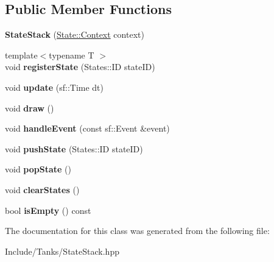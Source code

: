 \subsection*{Public Member Functions}
\begin{DoxyCompactItemize}
\item 
\hypertarget{class_state_stack_a365f29afd04a9370f6638cbe3b4ff92a}{}{\bfseries State\+Stack} (\hyperlink{struct_state_1_1_context}{State\+::\+Context} context)\label{class_state_stack_a365f29afd04a9370f6638cbe3b4ff92a}

\item 
\hypertarget{class_state_stack_a9d64daa479c2cccad6f2ede77741a352}{}{\footnotesize template$<$typename T $>$ }\\void {\bfseries register\+State} (States\+::\+I\+D state\+I\+D)\label{class_state_stack_a9d64daa479c2cccad6f2ede77741a352}

\item 
\hypertarget{class_state_stack_ae90af9f56ce7774d47d0407e2680c27d}{}void {\bfseries update} (sf\+::\+Time dt)\label{class_state_stack_ae90af9f56ce7774d47d0407e2680c27d}

\item 
\hypertarget{class_state_stack_a0990b973b2a0bdf8fad2f326e564931a}{}void {\bfseries draw} ()\label{class_state_stack_a0990b973b2a0bdf8fad2f326e564931a}

\item 
\hypertarget{class_state_stack_a70d3ffad9da499b8356789115f3e2acf}{}void {\bfseries handle\+Event} (const sf\+::\+Event \&event)\label{class_state_stack_a70d3ffad9da499b8356789115f3e2acf}

\item 
\hypertarget{class_state_stack_a80ed85f0fc13039e6f4c7dfef19e608f}{}void {\bfseries push\+State} (States\+::\+I\+D state\+I\+D)\label{class_state_stack_a80ed85f0fc13039e6f4c7dfef19e608f}

\item 
\hypertarget{class_state_stack_a7e050a57b798295c2344f1318765b5ee}{}void {\bfseries pop\+State} ()\label{class_state_stack_a7e050a57b798295c2344f1318765b5ee}

\item 
\hypertarget{class_state_stack_a49f0703d4037c3bf63494e64cb09898d}{}void {\bfseries clear\+States} ()\label{class_state_stack_a49f0703d4037c3bf63494e64cb09898d}

\item 
\hypertarget{class_state_stack_a63a73898d24eb0a68cac0215a9fda4fc}{}bool {\bfseries is\+Empty} () const \label{class_state_stack_a63a73898d24eb0a68cac0215a9fda4fc}

\end{DoxyCompactItemize}


The documentation for this class was generated from the following file\+:\begin{DoxyCompactItemize}
\item 
Include/\+Tanks/State\+Stack.\+hpp\end{DoxyCompactItemize}
